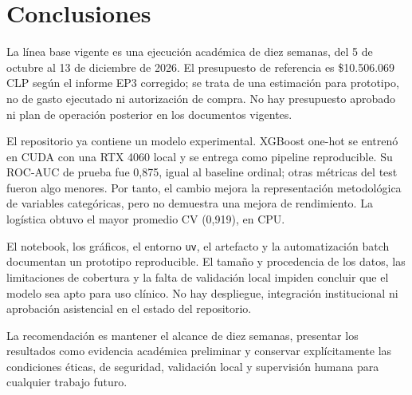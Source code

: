 \section{Conclusiones}

La línea base vigente es una ejecución académica de diez semanas, del 5 de octubre al 13 de diciembre de 2026. El presupuesto de referencia es \$10.506.069 CLP según el informe EP3 corregido; se trata de una estimación para prototipo, no de gasto ejecutado ni autorización de compra. No hay presupuesto aprobado ni plan de operación posterior en los documentos vigentes.

El repositorio ya contiene un modelo experimental. XGBoost one-hot se entrenó en CUDA con una RTX 4060 local y se entrega como pipeline reproducible. Su ROC-AUC de prueba fue 0,875, igual al baseline ordinal; otras métricas del test fueron algo menores. Por tanto, el cambio mejora la representación metodológica de variables categóricas, pero no demuestra una mejora de rendimiento. La logística obtuvo el mayor promedio CV (0,919), en CPU.

El notebook, los gráficos, el entorno \texttt{uv}, el artefacto y la automatización batch documentan un prototipo reproducible. El tamaño y procedencia de los datos, las limitaciones de cobertura y la falta de validación local impiden concluir que el modelo sea apto para uso clínico. No hay despliegue, integración institucional ni aprobación asistencial en el estado del repositorio.

La recomendación es mantener el alcance de diez semanas, presentar los resultados como evidencia académica preliminar y conservar explícitamente las condiciones éticas, de seguridad, validación local y supervisión humana para cualquier trabajo futuro.
